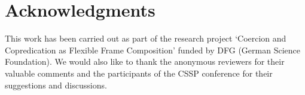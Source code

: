 \documentclass[output=paper,colorlinks,citecolor=brown,chinesefont]{langscibook}
\begin{document}
\section*{Acknowledgments}

This work has been carried out as part of the research project `Coercion and Copredication as Flexible Frame Composition' funded by DFG (German Science Foundation). We would also like to thank the anonymous reviewers for their valuable comments and the participants of the CSSP conference for their suggestions and discussions.

\end{document}

